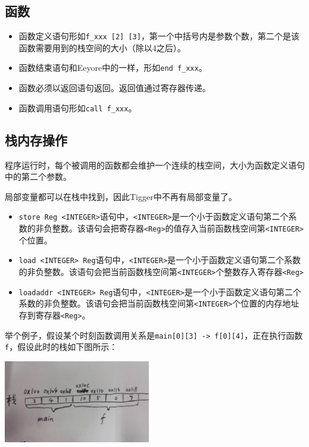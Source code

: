 \documentclass{ctexart}
\begin{document}
\subsection{函数}
\begin{itemize}
\item
函数定义语句形如\texttt{f\_xxx [2] [3]}，第一个中括号内是参数个数，第二个是该函数需要用到的栈空间的大小（除以4之后）。

\item
函数结束语句和Eeyore中的一样，形如\texttt{end f\_xxx}。

\item
函数必须以返回语句返回。返回值通过寄存器传递。

\item
函数调用语句形如\texttt{call f\_xxx}。
\end{itemize}
\subsection{栈内存操作}
程序运行时，每个被调用的函数都会维护一个连续的栈空间，大小为函数定义语句中的第二个参数。

局部变量都可以在栈中找到，因此Tigger中不再有局部变量了。

\begin{itemize}
\item
\texttt{store Reg <INTEGER>}语句中，\texttt{<INTEGER>}是一个小于函数定义语句第二个系数的非负整数。该语句会把寄存器\texttt{<Reg>}的值存入当前函数栈空间第\texttt{<INTEGER>}个位置。

\item
\texttt{load <INTEGER> Reg}语句中，\texttt{<INTEGER>}是一个小于函数定义语句第二个系数的非负整数。该语句会把当前函数栈空间第\texttt{<INTEGER>}个整数存入寄存器\texttt{<Reg>}

\item
\texttt{loadaddr <INTEGER> Reg}语句中，\texttt{<INTEGER>}是一个小于函数定义语句第二个系数的非负整数。该语句会把当前函数栈空间第\texttt{<INTEGER>}个位置的内存地址存到寄存器\texttt{<Reg>}。
\end{itemize}

举个例子，假设某个时刻函数调用关系是\texttt{main[0][3] -> f[0][4]}，正在执行函数\texttt{f}，假设此时的栈如下图所示：

\begin{center}\includegraphics[width=6.4cm,height=3.6cm]{stack}\end{center}
\end{document}

